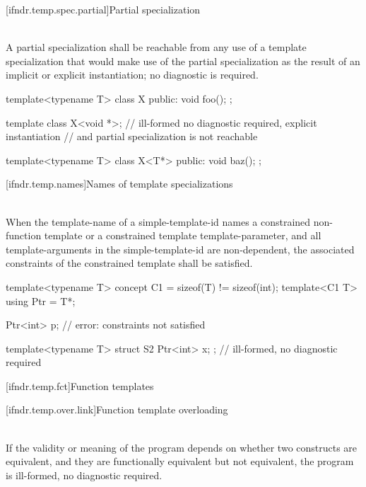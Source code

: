 [ifndr.temp.spec.partial]{Partial specialization}

\pnum
{} \\
A partial specialization shall be reachable from any use of a template specialization that would make use of the
partial specialization as the result of an implicit or explicit instantiation; no diagnostic is required.

\pnum
\begin{example}
\begin{codeblock}
template<typename T> class X{
public:
  void foo(){};
};

template class X<void *>;       // ill-formed no diagnostic required, explicit instantiation
                                // and partial specialization is not reachable

template<typename T> class X<T*>{
public:
  void baz();
};
\end{codeblock}
\end{example}


[ifndr.temp.names]{Names of template specializations}

\pnum
{} \\
When the template-name of a simple-template-id names a constrained non-function template or a constrained
template template-parameter, and all template-arguments in the simple-template-id are non-dependent,
the associated constraints of the constrained template shall be satisfied.

\pnum
\begin{example}
\begin{codeblock}
template<typename T> concept C1 = sizeof(T) != sizeof(int);
template<C1 T> using Ptr = T*;

Ptr<int> p; // error: constraints not satisfied

template<typename T>
struct S2 { Ptr<int> x; };      // ill-formed, no diagnostic required
\end{codeblock}
\end{example}


[ifndr.temp.fct]{Function templates}

[ifndr.temp.over.link]{Function template overloading}

\pnum
{} \\
If the validity or meaning of the program depends on whether two constructs are equivalent, and they are
functionally equivalent but not equivalent, the program is ill-formed, no diagnostic required.

